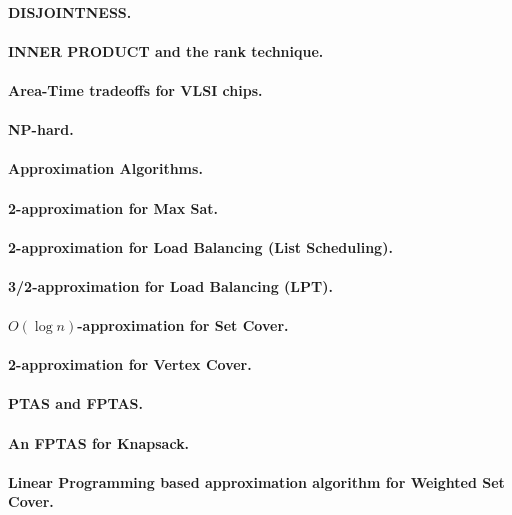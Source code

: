 \documentclass[11pt,a4paper]{article}
\theoremstyle{definition}
\begin{document}
\paragraph{DISJOINTNESS.}

\paragraph{INNER PRODUCT and the rank technique.}

\paragraph{Area-Time tradeoffs for VLSI chips.}

\paragraph{NP-hard.}

\paragraph{Approximation Algorithms.}

\paragraph{2-approximation for Max Sat.}

\paragraph{2-approximation for Load Balancing (List Scheduling).}

\paragraph{3/2-approximation for Load Balancing (LPT).}

\paragraph{$O(\log n)$-approximation for Set Cover.}

\paragraph{2-approximation for Vertex Cover.}

\paragraph{PTAS and FPTAS.}

\paragraph{An FPTAS for Knapsack.}

\paragraph{Linear Programming based approximation algorithm for Weighted Set Cover.}
\end{document}
